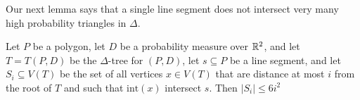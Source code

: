 \documentclass[acmtalg]{acmsmall}
\newcommand{\interior}{\mathrm{int}}
\begin{document}
%


Our next lemma says that a single line segment does not intersect
very many high probability triangles in $\Delta$.

\begin{lem}
Let $P$ be a polygon, let $D$ be a probability measure over $\mathbb{R}^2$, 
and let $T=T(P,D)$ be the $\Delta$-tree for $(P,D)$, let $s\subseteq P$ be
a line segment, and let $S_i\subseteq V(T)$ be the set of all vertices
$x\in V(T)$ that are distance at most $i$ from the root of $T$ and
such that
$\interior(x)$ intersect $s$.  Then $|S_i|\le 6i^2$
\end{lem}
\end{document}
